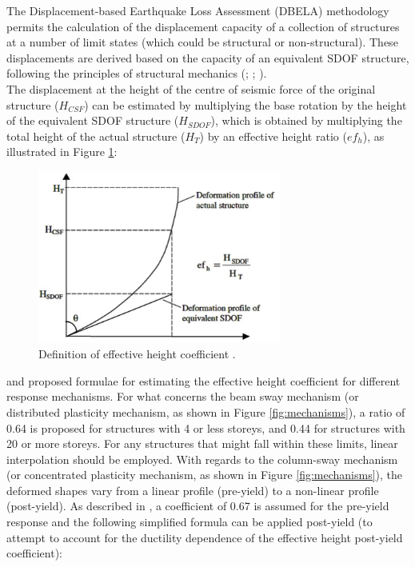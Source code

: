 The Displacement-based Earthquake Loss Assessment (DBELA) methodology permits the calculation of the displacement capacity of a collection of structures at a number of limit states (which could be structural or non-structural). These displacements are derived based on the capacity of an equivalent SDOF structure, following the principles of structural mechanics (\cite{CrowleyEtAl2004}; \cite{BalEtAl2010}; \cite{SilvaEtAl2013}).\\

The displacement at the height of the centre of seismic force of the original structure ($H_{CSF}$) can be estimated by multiplying the base rotation by the height of the equivalent SDOF structure ($H_{SDOF}$), which is obtained by multiplying the total height of the actual structure ($H_T$) by an effective height ratio ($ef_h$), as illustrated in Figure \ref{fig:efh}:

\begin{figure}[htb]
  \centering
      \includegraphics[width=8cm]{Figures/effective_height.png}
  \caption{Definition of effective height coefficient \cite{GlaisterPinho2003}.}
  \label{fig:efh}
\end{figure}
 
\cite{PinhoEtAl2002} and \cite{GlaisterPinho2003} proposed formulae for estimating the effective height coefficient for different response mechanisms. For what concerns the beam sway mechanism (or distributed plasticity mechanism, as shown in Figure \ref{fig:mechanisms}), a ratio of 0.64 is proposed for structures with 4 or less storeys, and 0.44 for structures with 20 or more storeys. For any structures that might fall within these limits, linear interpolation should be employed. With regards to the column-sway mechanism (or concentrated plasticity mechanism, as shown in Figure \ref{fig:mechanisms}), the deformed shapes vary from a linear profile (pre-yield) to a non-linear profile (post-yield). As described in \cite{GlaisterPinho2003}, a coefficient of 0.67 is assumed for the pre-yield response and the following simplified formula can be applied post-yield (to attempt to account for the ductility dependence of the effective height post-yield coefficient):
 
